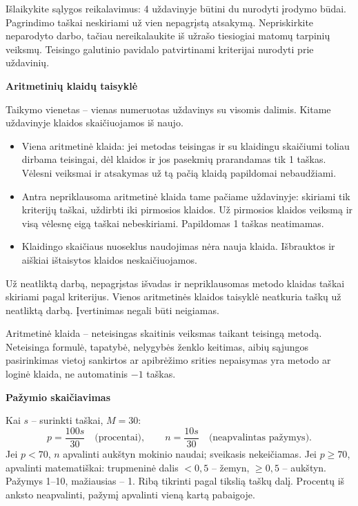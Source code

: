 \documentclass[11pt]{article}
\newcommand{\sk}[1]{\par\medskip\textbf{#1}\par}
\begin{document}
Išlaikykite sąlygos reikalavimus: 4 uždavinyje būtini du nurodyti įrodymo būdai. Pagrindimo taškai neskiriami už vien nepagrįstą atsakymą. Nepriskirkite neparodyto darbo, tačiau nereikalaukite iš užrašo tiesiogiai matomų tarpinių veiksmų. Teisingo galutinio pavidalo patvirtinami kriterijai nurodyti prie uždavinių.
\sk{Aritmetinių klaidų taisyklė}
Taikymo vienetas -- vienas numeruotas uždavinys su visomis dalimis. Kitame uždavinyje klaidos skaičiuojamos iš naujo.
\begin{itemize}
\item Viena aritmetinė klaida: jei metodas teisingas ir su klaidingu skaičiumi toliau dirbama teisingai, dėl klaidos ir jos pasekmių prarandamas tik 1 taškas. Vėlesni veiksmai ir atsakymas už tą pačią klaidą papildomai nebaudžiami.
\item Antra nepriklausoma aritmetinė klaida tame pačiame uždavinyje: skiriami tik kriterijų taškai, uždirbti iki pirmosios klaidos. Už pirmosios klaidos veiksmą ir visą vėlesnę eigą taškai nebeskiriami. Papildomas 1 taškas neatimamas.
\item Klaidingo skaičiaus nuoseklus naudojimas nėra nauja klaida. Išbrauktos ir aiškiai ištaisytos klaidos neskaičiuojamos.
\end{itemize}
Už neatliktą darbą, nepagrįstas išvadas ir nepriklausomas metodo klaidas taškai skiriami pagal kriterijus. Vienos aritmetinės klaidos taisyklė neatkuria taškų už neatliktą darbą. Įvertinimas negali būti neigiamas.

Aritmetinė klaida -- neteisingas skaitinis veiksmas taikant teisingą metodą. Neteisinga formulė, tapatybė, nelygybės ženklo keitimas, aibių sąjungos pasirinkimas vietoj sankirtos ar apibrėžimo srities nepaisymas yra metodo ar loginė klaida, ne automatinis $-1$ taškas.
\sk{Pažymio skaičiavimas}
Kai $s$ -- surinkti taškai, $M=30$:
\[p=\frac{100s}{30}\quad\text{(procentai)},\qquad n=\frac{10s}{30}\quad\text{(neapvalintas pažymys)}.\]
Jei $p<70$, $n$ apvalinti aukštyn mokinio naudai; sveikasis nekeičiamas. Jei $p\ge70$, apvalinti matematiškai: trupmeninė dalis $<0{,}5$ -- žemyn, $\ge0{,}5$ -- aukštyn. Pažymys 1--10, mažiausias -- 1. Ribą tikrinti pagal tikslią taškų dalį. Procentų iš anksto neapvalinti, pažymį apvalinti vieną kartą pabaigoje.
\end{document}
